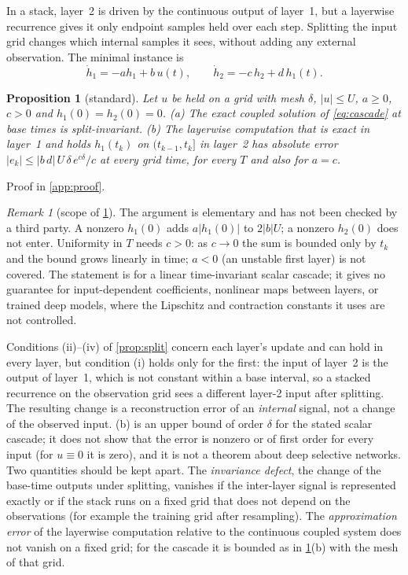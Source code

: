\documentclass{article}
\theoremstyle{plain}
\newtheorem{proposition}[theorem]{Proposition}
\theoremstyle{definition}
\theoremstyle{remark}
\newtheorem{remark}[theorem]{Remark}
\begin{document}
In a stack, layer~2 is driven by the continuous output of layer~1, but a layerwise recurrence gives it only endpoint samples held over each step.
Splitting the input grid changes which internal samples it sees, without adding any external observation.
The minimal instance is
\begin{equation}
\dot h_1=-a h_1+b\,u(t),\qquad \dot h_2=-c\,h_2+d\,h_1(t).
\label{eq:cascade}
\end{equation}

\begin{proposition}[standard]
\label{prop:cascade}
Let $u$ be held on a grid with mesh $\delta$, $|u|\le U$, $a\ge0$, $c>0$ and $h_1(0)=h_2(0)=0$.
(a) The exact coupled solution of \eqref{eq:cascade} at base times is split-invariant.
(b) The layerwise computation that is exact in layer~1 and holds $h_1(t_k)$ on $(t_{k-1},t_k]$ in layer~2 has absolute error $|e_k|\le|b\,d|\,U\,\delta\,e^{c\delta}/c$ at every grid time, for every $T$ and also for $a=c$.
\end{proposition}
Proof in \cref{app:proof}.

\begin{remark}[scope of \cref{prop:cascade}]
\label{rem:scope}
The argument is elementary and has not been checked by a third party.
A nonzero $h_1(0)$ adds $a|h_1(0)|$ to $2|b|U$; a nonzero $h_2(0)$ does not enter.
Uniformity in $T$ needs $c>0$: as $c\to0$ the sum is bounded only by $t_k$ and the bound grows linearly in time; $a<0$ (an unstable first layer) is not covered.
The statement is for a linear time-invariant scalar cascade; it gives no guarantee for input-dependent coefficients, nonlinear maps between layers, or trained deep models, where the Lipschitz and contraction constants it uses are not controlled.
\end{remark}

Conditions (ii)--(iv) of \cref{prop:split} concern each layer's update and can hold in every layer, but condition (i) holds only for the first: the input of layer~2 is the output of layer~1, which is not constant within a base interval, so a stacked recurrence on the observation grid sees a different layer-2 input after splitting.
The resulting change is a reconstruction error of an \emph{internal} signal, not a change of the observed input.
(b) is an upper bound of order $\delta$ for the stated scalar cascade; it does not show that the error is nonzero or of first order for every input (for $u\equiv0$ it is zero), and it is not a theorem about deep selective networks.
Two quantities should be kept apart.
The \emph{invariance defect}, the change of the base-time outputs under splitting, vanishes if the inter-layer signal is represented exactly or if the stack runs on a fixed grid that does not depend on the observations (for example the training grid after resampling).
The \emph{approximation error} of the layerwise computation relative to the continuous coupled system does not vanish on a fixed grid; for the cascade it is bounded as in \cref{prop:cascade}(b) with the mesh of that grid.
\end{document}
